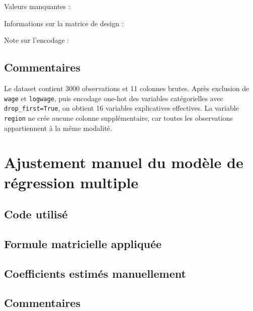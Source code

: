 \documentclass[12pt,letterpaper]{article}
\begin{document}
Valeurs manquantes :


Informations sur la matrice de design :


Note sur l'encodage :


\subsection{Commentaires}

Le dataset contient 3000 observations et 11 colonnes brutes.
Après exclusion de \texttt{wage} et \texttt{logwage}, puis encodage one-hot des variables catégorielles avec \texttt{drop\_first=True}, on obtient 16 variables explicatives effectives.
La variable \texttt{region} ne crée aucune colonne supplémentaire, car toutes les observations appartiennent à la même modalité.

\section{Ajustement manuel du modèle de régression multiple}

\subsection{Code utilisé}



\subsection{Formule matricielle appliquée}



\subsection{Coefficients estimés manuellement}



\subsection{Commentaires}
\end{document}
